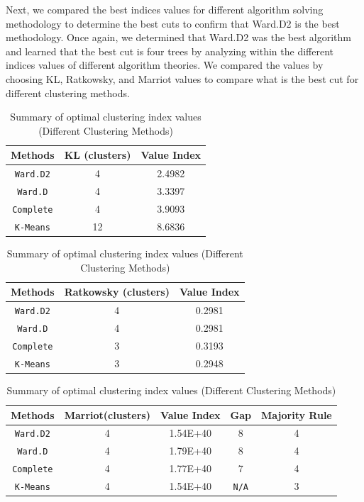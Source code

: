 \documentclass[10pt,twoside]{article}
\numberwithin{equation}{section}
\newcommand{\?}{\stackrel{?}{=}}
\begin{document}
Next, we compared the best indices values for different algorithm solving methodology to determine the best cuts to confirm that Ward.D2 is the best methodology. Once again, we determined that Ward.D2 was the best algorithm and learned that the best cut is four trees by analyzing within the different indices values of different algorithm theories. We compared the values by choosing KL, Ratkowsky, and Marriot values to compare what is the best cut for different clustering methods. 

\begin{table}[h!]
  \centering
  \begin{tabular}{c c c}\toprule
    \bf Methods & \bf KL (clusters) & \bf Value Index \\\midrule
    \texttt{Ward.D2} & 4 & 2.4982 \\\hline
    \texttt{Ward.D} & 4 & 3.3397 \\\hline
    \texttt{Complete} & 4 & 3.9093 \\\hline
     \texttt{K-Means} & 12 & 8.6836  \\\bottomrule
  \end{tabular}
   \centering
  \begin{tabular}{c c c}\toprule
    \bf Methods & \bf Ratkowsky (clusters) & \bf Value Index \\\midrule
    \texttt{Ward.D2} & 4 & 0.2981 \\\hline
    \texttt{Ward.D} & 4 & 0.2981 \\\hline
    \texttt{Complete} & 3 & 0.3193 \\\hline
     \texttt{K-Means} & 3 & 0.2948 \\\bottomrule
  \end{tabular}
   \centering
  \begin{tabular}{c c c c c}\toprule
    \bf Methods & \bf Marriot(clusters) & \bf Value Index & \bf Gap & \bf Majority Rule  \\\midrule
    \texttt{Ward.D2} & 4 & 1.54E+40 &  8 & 4 \\\hline
    \texttt{Ward.D} & 4 & 1.79E+40 & 8 & 4 \\\hline
    \texttt{Complete} & 4 & 1.77E+40  & 7 & 4 \\\hline
     \texttt{K-Means} & 4 & 1.54E+40  & \texttt{N/A} & 3  \\\bottomrule
  \end{tabular}
  \caption{Summary of optimal clustering index values (Different Clustering Methods)}
  \label{tab:summary-optimal}
\end{table}
\end{document}
